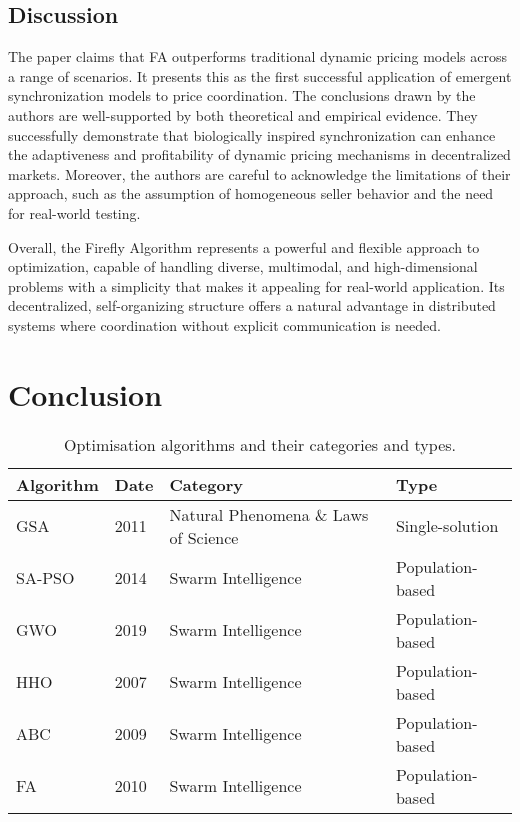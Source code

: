 \documentclass[a4paper, 12pt]{extarticle}
\begin{document}
\subsection{Discussion}

The paper \cite{jumadinova2008firefly} claims that FA outperforms traditional dynamic pricing models across a range of scenarios. It presents this as the first successful application of emergent synchronization models to price coordination. The conclusions drawn by the authors are well-supported by both theoretical and empirical evidence. They successfully demonstrate that biologically inspired synchronization can enhance the adaptiveness and profitability of dynamic pricing mechanisms in decentralized markets. Moreover, the authors are careful to acknowledge the limitations of their approach, such as the assumption of homogeneous seller behavior and the need for real-world testing.  

Overall, the Firefly Algorithm represents a powerful and flexible approach to optimization, capable of handling diverse, multimodal, and high-dimensional problems with a simplicity that makes it appealing for real-world application. Its decentralized, self-organizing structure offers a natural advantage in distributed systems where coordination without explicit communication is needed. 


\newpage
\section{Conclusion}

\begin{table}[h!]
    \centering
    \begin{tabular}{llll} 
        \toprule
        \textbf{Algorithm} & \textbf{Date} & \textbf{Category} & \textbf{Type} \\
        \midrule
        GSA         & 2011 & Natural Phenomena \& Laws of Science  & Single-solution  \\
        SA-PSO      & 2014 & Swarm Intelligence                    & Population-based \\
        GWO         & 2019 & Swarm Intelligence                    & Population-based \\
        HHO         & 2007 & Swarm Intelligence                    & Population-based \\
        ABC         & 2009 & Swarm Intelligence                    & Population-based \\
        FA          & 2010 & Swarm Intelligence                    & Population-based \\
        \bottomrule
    \end{tabular}
    \caption{Optimisation algorithms and their categories and types.}
\end{table}
\end{document}
